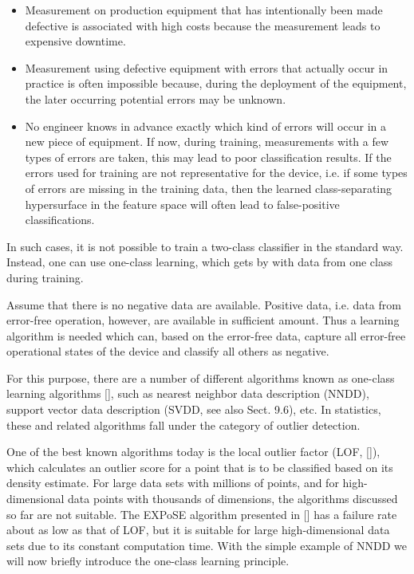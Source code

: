 \documentclass[10pt]{book}
\begin{document}
\begin{itemize}
  \item Measurement on production equipment that has intentionally been made defective is associated with high costs because the measurement leads to expensive downtime.
  \item Measurement using defective equipment with errors that actually occur in practice is often impossible because, during the deployment of the equipment, the later occurring potential errors may be unknown.
  \item No engineer knows in advance exactly which kind of errors will occur in a new piece of equipment. If now, during training, measurements with a few types of errors are taken, this may lead to poor classification results. If the errors used for training are not representative for the device, i.e. if some types of errors are missing in the training data, then the learned class-separating hypersurface in the feature space will often lead to false-positive classifications.
\end{itemize}
In such cases, it is not possible to train a two-class classifier in the standard way. Instead, one can use one-class learning, which gets by with data from one class during training.

Assume that there is no negative data are available. Positive data, i.e. data from error-free operation, however, are available in sufficient amount. Thus a learning algorithm is needed which can, based on the error-free data, capture all error-free operational states of the device and classify all others as negative.

For this purpose, there are a number of different algorithms known as one-class learning algorithms [\cite{tax2001oneclass}], such as nearest neighbor data description (NNDD), support vector data description (SVDD, see also Sect. 9.6), etc. In statistics, these and related algorithms fall under the category of outlier detection.

One of the best known algorithms today is the local outlier factor (LOF, [\cite{breunig2000lof}]), which calculates an outlier score for a point that is to be classified based on its density estimate. For large data sets with millions of points, and for high-dimensional data points with thousands of dimensions, the algorithms discussed so far are not suitable. The EXPoSE algorithm presented in [\cite{schneider2016ese}] has a failure rate about as low as that of LOF, but it is suitable for large high-dimensional data sets due to its constant computation time. With the simple example of NNDD we will now briefly introduce the one-class learning principle.
\end{document}

